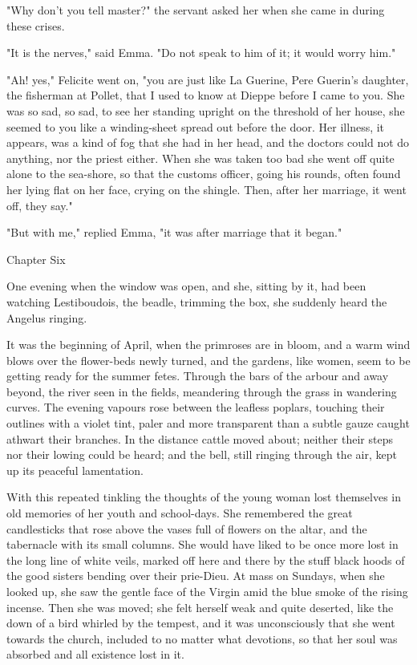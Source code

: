 \documentclass[11pt,twocolumn]{ltugboat}
\begin{document}
"Why don't you tell master?" the servant asked her when she came in
during these crises.

"It is the nerves," said Emma. "Do not speak to him of it; it would
worry him."

"Ah! yes," Felicite went on, "you are just like La Guerine, Pere
Guerin's daughter, the fisherman at Pollet, that I used to know at
Dieppe before I came to you. She was so sad, so sad, to see her
standing upright on the threshold of her house, she seemed to you like a
winding-sheet spread out before the door. Her illness, it appears, was
a kind of fog that she had in her head, and the doctors could not do
anything, nor the priest either. When she was taken too bad she went
off quite alone to the sea-shore, so that the customs officer, going his
rounds, often found her lying flat on her face, crying on the shingle.
Then, after her marriage, it went off, they say."

"But with me," replied Emma, "it was after marriage that it began."



Chapter Six

One evening when the window was open, and she, sitting by it, had been
watching Lestiboudois, the beadle, trimming the box, she suddenly heard
the Angelus ringing.

It was the beginning of April, when the primroses are in bloom, and a
warm wind blows over the flower-beds newly turned, and the gardens, like
women, seem to be getting ready for the summer fetes. Through the bars
of the arbour and away beyond, the river seen in the fields, meandering
through the grass in wandering curves. The evening vapours rose between
the leafless poplars, touching their outlines with a violet tint, paler
and more transparent than a subtle gauze caught athwart their branches.
In the distance cattle moved about; neither their steps nor their lowing
could be heard; and the bell, still ringing through the air, kept up its
peaceful lamentation.

With this repeated tinkling the thoughts of the young woman lost
themselves in old memories of her youth and school-days. She remembered
the great candlesticks that rose above the vases full of flowers on the
altar, and the tabernacle with its small columns. She would have liked
to be once more lost in the long line of white veils, marked off here
and there by the stuff black hoods of the good sisters bending over
their prie-Dieu. At mass on Sundays, when she looked up, she saw the
gentle face of the Virgin amid the blue smoke of the rising incense.
Then she was moved; she felt herself weak and quite deserted, like the
down of a bird whirled by the tempest, and it was unconsciously that she
went towards the church, included to no matter what devotions, so that
her soul was absorbed and all existence lost in it.
\end{document}
